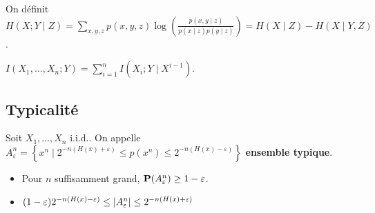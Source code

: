 \begin{defn}
	On définit $H(X ; Y \mid Z) = \sum_{x,y,z} p(x,y,z) \log \left( \frac{p(x,y \mid z)}{p(x \mid z) p(y \mid z)} \right) = H(X \mid Z) - H(X \mid Y, Z)$.
\end{defn}

\begin{thm}
	$I(X_1,\ldots,X_n ; Y) = \sum_{i = 1}^n I(X_i ; Y \mid X^{i - 1})$.
\end{thm}

\subsection{Typicalité}

	\begin{defn}
		Soit $X_1,\ldots,X_n$ i.i.d..
		On appelle $A_\varepsilon^n = \left\{ x^n \mid 2^{-n(H(x) + \varepsilon)} \leq p(x^n) \leq 2^{-n(H(x) - \varepsilon)} \right\}$ \textbf{ensemble typique}.
	\end{defn}

	\begin{thm}
		\begin{itemize}
			\item[\textbullet] Pour $n$ suffisamment grand, $\mathbf{P}(A_\varepsilon^n) \geq 1 - \varepsilon$.
			\item[\textbullet] $(1 - \varepsilon) 2^{-n(H(x) - \varepsilon)} \leq \left\lvert A_\varepsilon^n\right\rvert \leq 2^{-n(H(x) + \varepsilon)}$
		\end{itemize}
	\end{thm}

